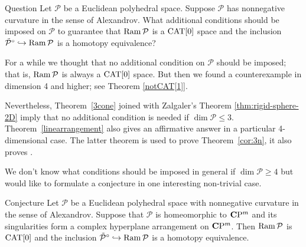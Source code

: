 \documentclass{compositio}
\begin{document}
\begin{thm}{Question}\label{quest:generalized}
Let $\mathcal{P}$ be a Euclidean polyhedral space. Suppose $\mathcal{P}$ has nonnegative curvature in the sense of Alexandrov.
What additional conditions should be imposed on $\mathcal{P}$  to guarantee that $\mathop{\rm Ram}\nolimits \mathcal{P}$ is a $\mathrm{CAT}[0]$ space
and the inclusion $\tilde{\mathcal{P}}^\circ\hookrightarrow\mathop{\rm Ram}\nolimits \mathcal{P}$ is a homotopy equivalence?
\end{thm}





For a while we thought that no additional condition on $\mathcal{P}$ should be imposed;
that is, $\mathop{\rm Ram}\nolimits \mathcal{P}$ is always a $\mathrm{CAT}[0]$ space.  
But then we found a counterexample in dimension 4 and higher;
see Theorem \ref{notCAT[1]}.

Nevertheless, Theorem~\ref{3cone} joined with Zalgaler's Theorem \ref{thm:rigid-sphere-2D}
imply that no additional condition is needed if $\dim \mathcal{P}\le 3$.
Theorem~\ref{linearrangement} also gives an affirmative answer in a particular 4-dimensional case.
The latter theorem is used to prove Theorem~\ref{cor:3n},
it also proves \cite[Conjecture 8.2]{panov}.

We don't know what conditions should be imposed in general if $\dim \mathcal{P}\ge 4$
but would like to formulate a conjecture in one interesting non-trivial case.

\begin{thm}{Conjecture} \label{planearrangement1} Let $\mathcal{P}$ be a Euclidean polyhedral space with nonnegative curvature in the sense of Alexandrov.
Suppose  that $\mathcal{P}$ is homeomorphic to $\mathbf{C}\mathrm{P}^m$ and its singularities form a complex hyperplane arrangement on $\mathbf{C}\mathrm{P}^m$. 
Then $\mathop{\rm Ram}\nolimits \mathcal{P}$ is  $\mathrm{CAT}[0]$ 
and the inclusion $\tilde{\mathcal{P}}^\circ\hookrightarrow\mathop{\rm Ram}\nolimits \mathcal{P}$ is a homotopy equivalence.
\end{thm}
\end{document}
